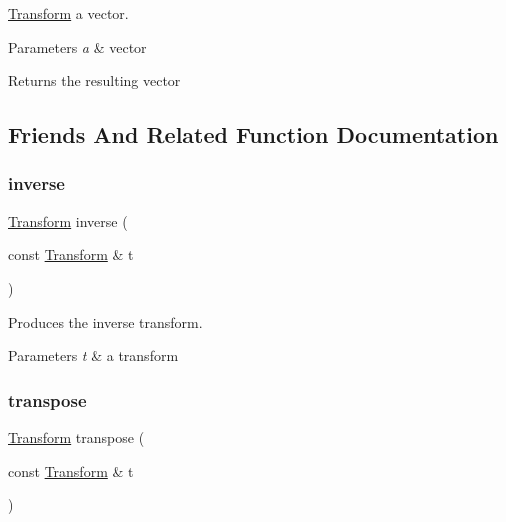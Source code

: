 \mbox{\hyperlink{classomg_1_1_transform}{Transform}} a vector. 


\begin{DoxyParams}{Parameters}
{\em a} & vector \\
\hline
\end{DoxyParams}
\begin{DoxyReturn}{Returns}
the resulting vector 
\end{DoxyReturn}


\subsection{Friends And Related Function Documentation}
\mbox{\label{classomg_1_1_transform_a31b9af404ee2dd732645cf796dc1aa62}} 
\subsubsection{\texorpdfstring{inverse}{inverse}}
{\footnotesize\ttfamily \mbox{\hyperlink{classomg_1_1_transform}{Transform}} inverse (\begin{DoxyParamCaption}\item[{const \mbox{\hyperlink{classomg_1_1_transform}{Transform}} \&}]{t }\end{DoxyParamCaption})\hspace{0.3cm}{\ttfamily [friend]}}



Produces the inverse transform. 


\begin{DoxyParams}{Parameters}
{\em t} & a transform \\
\hline
\end{DoxyParams}
\mbox{\label{classomg_1_1_transform_a10d88784f95b7d578a498fe5d3ee6fa8}} 
\subsubsection{\texorpdfstring{transpose}{transpose}}
{\footnotesize\ttfamily \mbox{\hyperlink{classomg_1_1_transform}{Transform}} transpose (\begin{DoxyParamCaption}\item[{const \mbox{\hyperlink{classomg_1_1_transform}{Transform}} \&}]{t }\end{DoxyParamCaption})\hspace{0.3cm}{\ttfamily [friend]}}



